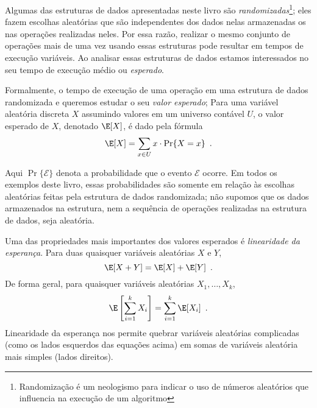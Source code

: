 %
%
%
%
%
Algumas das estruturas de dados apresentadas neste livro são \emph{randomizadas}\footnote{Randomização é um neologismo para indicar o uso de números aleatórios que influencia na execução de um algoritmo};
eles fazem escolhas aleatórias que são independentes dos dados nelas armazenadas
os nas operações realizadas neles. Por essa razão,
realizar o mesmo conjunto de operações mais de uma vez usando essas
estruturas pode resultar em tempos de execução variáveis. Ao analisar essas
estruturas de dados estamos interessados no seu tempo de execução médio ou \emph{esperado}.
%
%

Formalmente, o tempo de execução de uma operação em uma estrutura de dados randomizada e queremos estudar o seu \emph{valor esperado};
%
Para uma variável aleatória discreta
 $X$ assumindo valores em um universo contável 
$U$, o valor esperado de $X$, denotado $\E[X]$, é dado pela fórmula 
\[
    \E[X] = \sum_{x\in U} x\cdot\Pr\{X=x\} \enspace .
\]

Aqui $\Pr\{\mathcal{E}\}$ denota a probabilidade que o evento 
$\mathcal{E}$ ocorre.  Em todos os exemplos deste livro, essas probabilidades
são somente em relação às escolhas aleatórias feitas pela estrutura de dados randomizada; não supomos que os dados armazenados na estrutura, nem a sequência de operações realizadas na estrutura de dados, seja aleatória.

Uma das propriedades mais importantes dos valores esperados é 
\emph{linearidade da esperança}.
%
Para duas quaisquer variáveis aleatórias $X$ e $Y$,
\[
   \E[X+Y] = \E[X] + \E[Y] \enspace .
\]
De forma geral, para quaisquer variáveis aleatórias $X_1,\ldots,X_k$,
\[
   \E\left[\sum_{i=1}^k X_i\right] = \sum_{i=1}^k \E[X_i] \enspace .
\]
Linearidade da esperança nos permite quebrar variáveis aleatórias complicadas (como os lados esquerdos das equações acima) em somas de variáveis aleatória mais simples (lados direitos).

